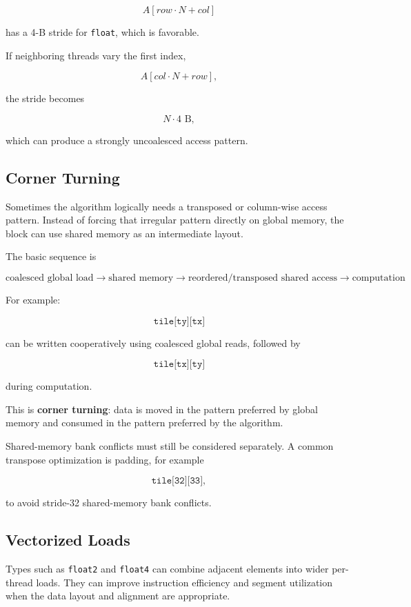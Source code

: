 \documentclass[11pt]{article}
\newcommand{\key}[1]{\textbf{#1}}
\begin{document}
\[
A[row\cdot N+col]
\]

has a 4-B stride for \texttt{float}, which is favorable.

If neighboring threads vary the first index,

\[
A[col\cdot N+row],
\]

the stride becomes

\[
N\cdot 4\text{ B},
\]

which can produce a strongly uncoalesced access pattern.

\subsection{Corner Turning}

Sometimes the algorithm logically needs a transposed or column-wise access pattern. Instead of forcing that irregular pattern directly on global memory, the block can use shared memory as an intermediate layout.

The basic sequence is

\[
\boxed{
\text{coalesced global load}
\rightarrow
\text{shared memory}
\rightarrow
\text{reordered/transposed shared access}
\rightarrow
\text{computation}
}
\]

For example:

\[
\texttt{tile[ty][tx]}
\]

can be written cooperatively using coalesced global reads, followed by

\[
\texttt{tile[tx][ty]}
\]

during computation.

This is \key{corner turning}: data is moved in the pattern preferred by global memory and consumed in the pattern preferred by the algorithm.

Shared-memory bank conflicts must still be considered separately. A common transpose optimization is padding, for example

\[
\texttt{tile[32][33]},
\]

to avoid stride-32 shared-memory bank conflicts.

\subsection{Vectorized Loads}

Types such as \texttt{float2} and \texttt{float4} can combine adjacent elements into wider per-thread loads. They can improve instruction efficiency and segment utilization when the data layout and alignment are appropriate.
\end{document}

